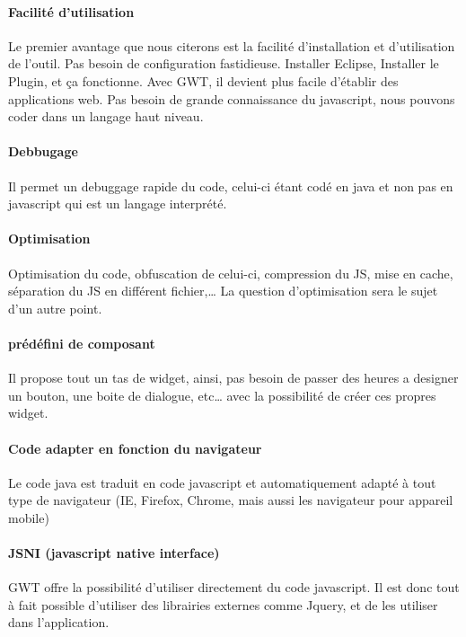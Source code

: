 \paragraph{Facilité d'utilisation}
Le premier avantage que nous citerons est la facilité d'installation et d'utilisation de l'outil. Pas besoin de configuration fastidieuse. Installer Eclipse, Installer le Plugin, et ça fonctionne.
Avec GWT, il devient plus facile d'établir des applications web. Pas besoin de grande connaissance du javascript, nous pouvons coder dans un langage haut niveau.

\paragraph{Debbugage}
Il permet un debuggage rapide du code, celui-ci étant codé en java et non pas en javascript qui est un langage interprété.

\paragraph{Optimisation}
Optimisation du code, obfuscation de celui-ci, compression du JS, mise en cache, séparation du JS en différent fichier,… La question d'optimisation sera le sujet d'un autre point.

\paragraph{prédéfini de composant}
Il propose tout un tas de widget, ainsi, pas besoin de passer des heures a designer un bouton, une boite de dialogue, etc… avec la possibilité de créer ces propres widget.

\paragraph{Code adapter en fonction du navigateur}
Le code java est traduit en code javascript et automatiquement adapté à tout type de navigateur (IE, Firefox, Chrome, mais aussi les navigateur pour appareil mobile)

\paragraph{JSNI (javascript native interface)}
GWT offre la possibilité d'utiliser directement du code javascript. Il est donc tout à fait possible d'utiliser des librairies externes comme Jquery, et de les utiliser dans l'application.

